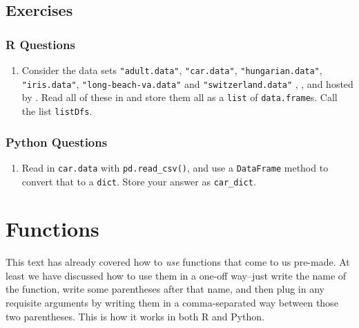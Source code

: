 \documentclass[
  12pt,
  krantz2]{krantz}
\providecommand{\tightlist}{%
  \setlength{\itemsep}{0pt}\setlength{\parskip}{0pt}}
\begin{document}
\hypertarget{exercises-3}{%
\section{Exercises}\label{exercises-3}}

\hypertarget{r-questions-3}{%
\subsection{R Questions}\label{r-questions-3}}

\begin{enumerate}
\def\labelenumi{\arabic{enumi}.}
\tightlist
\item
  Consider the data sets \texttt{"adult.data"}, \texttt{"car.data"}, \texttt{"hungarian.data"}, \texttt{"iris.data"}, \texttt{"long-beach-va.data"} and \texttt{"switzerland.data"} \citep{misc_heart_disease_45}, \citep{misc_iris_53}, \citep{misc_adult_2} and \citep{misc_car_evaluation_19} hosted by \citep{uci_data}. Read all of these in and store them all as a \texttt{list} of \texttt{data.frame}s. Call the list \texttt{listDfs}.
\end{enumerate}

\hypertarget{python-questions-3}{%
\subsection{Python Questions}\label{python-questions-3}}

\begin{enumerate}
\def\labelenumi{\arabic{enumi}.}
\tightlist
\item
  Read in \texttt{car.data} with \texttt{pd.read\_csv()}, and use a \texttt{DataFrame} method to convert that to a \texttt{dict}. Store your answer as \texttt{car\_dict}.
\end{enumerate}

\hypertarget{functions}{%
\chapter{Functions}\label{functions}}

This text has already covered how to \emph{use} functions that come to us pre-made. At least we have discussed how to use them in a one-off way--just write the name of the function, write some parentheses after that name, and then plug in any requisite arguments by writing them in a comma-separated way between those two parentheses. This is how it works in both R and Python.
\end{document}
